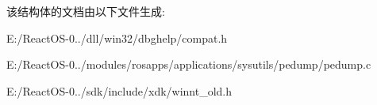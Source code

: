 该结构体的文档由以下文件生成\+:\begin{DoxyCompactItemize}
\item 
E\+:/\+React\+O\+S-\/0../dll/win32/dbghelp/compat.\+h\item 
E\+:/\+React\+O\+S-\/0../modules/rosapps/applications/sysutils/pedump/pedump.\+c\item 
E\+:/\+React\+O\+S-\/0../sdk/include/xdk/winnt\+\_\+old.\+h\end{DoxyCompactItemize}
